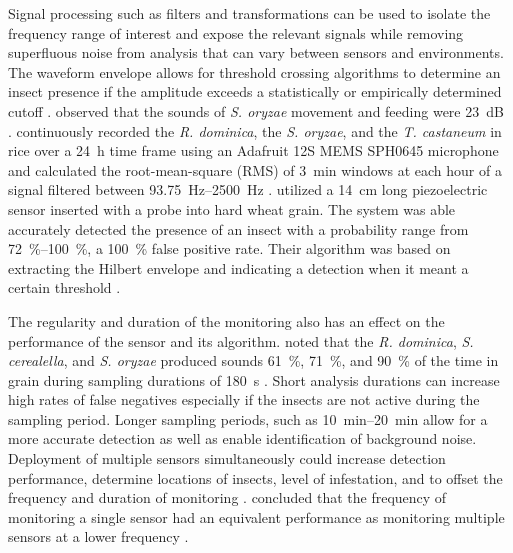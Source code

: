 Signal processing such as filters and transformations can be used to isolate the frequency range of interest and expose the relevant signals while removing superfluous noise from analysis that can vary between sensors and environments. The waveform envelope allows for threshold crossing algorithms to determine an insect presence if the amplitude exceeds a statistically or empirically determined cutoff \cite{mankinAutomatedApplicationsAcoustics2021}. \citeauthor{mankinNoiseShieldingAcoustic1996} observed that the sounds of \textit{S. oryzae} movement and feeding were \SI{23}{\deci\bel} \cite{mankinNoiseShieldingAcoustic1996}. \citeauthor{balingbingDeterminingSoundSignatures2024} continuously recorded the \textit{R. dominica}, the \textit{S. oryzae}, and the \textit{T. castaneum} in rice over a \SI{24}{\hour} time frame using an Adafruit 12S MEMS SPH0645 microphone and calculated the root-mean-square (RMS) of \SI{3}{\minute} windows at each hour of a signal filtered between \SIrange{93.75}{2500}{\hertz} \cite{balingbingDeterminingSoundSignatures2024}. \citeauthor{eliopoulosDetectionAdultBeetles2015} utilized a \SI{14}{\centi\meter} long piezoelectric sensor inserted with a probe into hard wheat grain. The system was able accurately detected the presence of an insect with a probability range from \SIrange{72}{100}{\percent}, a \SI{100}{\percent} false positive rate. Their algorithm was based on extracting the Hilbert envelope and indicating a detection when it meant a certain threshold \cite{eliopoulosDetectionAdultBeetles2015}.

The regularity and duration of the monitoring also has an effect on the performance of the sensor and its algorithm. \citeauthor{vickSoundDetectionStoredProduct1988} noted that the \textit{R. dominica}, \textit{S. cerealella}, and \textit{S. oryzae} produced sounds \SI{61}{\percent}, \SI{71}{\percent}, and \SI{90}{\percent} of the time in grain during sampling durations of \SI{180}{\second} \cite{vickSoundDetectionStoredProduct1988}. Short analysis durations can increase high rates of false negatives especially if the insects are not active during the sampling period. Longer sampling periods, such as \SIrange{10}{20}{\minute} allow for a more accurate detection as well as enable identification of background noise. Deployment of multiple sensors simultaneously could increase detection performance, determine locations of insects, level of infestation, and to offset the frequency and duration of monitoring \cite{mankinPerspectivePromiseCentury2011}. \citeauthor{hagstrumAutomatedAcousticalMonitoring1991} concluded that the frequency of monitoring a single sensor had an equivalent performance as monitoring multiple sensors at a lower frequency \cite{hagstrumAutomatedAcousticalMonitoring1991}.

